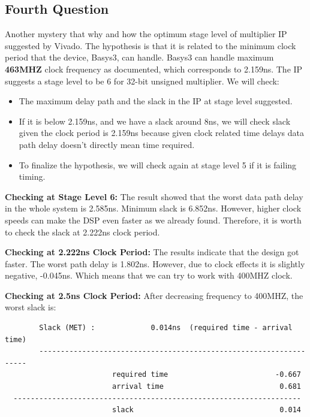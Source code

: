 \documentclass{report}
\begin{document}
\subsection{Fourth Question}
Another mystery that why and how the optimum stage level of multiplier IP suggested by Vivado. The hypothesis is that it is related to the minimum clock period that the device, Basys3, can handle. Basys3 can handle maximum \textbf{463MHZ} clock frequency as documented, which corresponds to 2.159ns. The IP suggests a stage level to be 6 for 32-bit unsigned multiplier. We will check:
\begin{itemize}
    \item The maximum delay path and the slack in the IP at stage level suggested.
    \item If it is below 2.159ns, and we have a slack around 8ns, we will check slack given the clock period is 2.159ns because given clock related time delays data path delay doesn't directly mean time required.
    \item To finalize the hypothesis, we will check again at stage level 5 if it is failing timing.
\end{itemize}

\textbf{Checking at Stage Level 6:}
The result showed that the worst data path delay in the whole system is 2.585ns. Minimum slack is 6.852ns. However, higher clock speeds can make the DSP  even faster as we already found. Therefore, it is worth to check the slack at 2.222ns clock period.

\textbf{Checking at 2.222ns Clock Period:}
The results indicate that the design got faster. The worst path delay is 1.802ns. However, due to clock effects it is slightly negative, -0.045ns. Which means that we can try to work with 400MHZ clock.

\textbf{Checking at 2.5ns Clock Period:}
After decreasing frequency to 400MHZ, the worst slack is:
\begin{verbatim}
        Slack (MET) :             0.014ns  (required time - arrival time)
        -------------------------------------------------------------------
                         required time                         -0.667    
                         arrival time                           0.681    
  -------------------------------------------------------------------
                         slack                                  0.014    
\end{verbatim}
\end{document}
